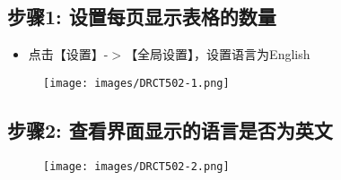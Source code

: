 \subsection{步骤1: 设置每页显示表格的数量}
\label{步骤1:设置每页显示表格的数量}

\begin{itemize}
\item 点击【设置】-$>$【全局设置】，设置语言为English

\end{itemize}

\begin{figure}[htbp]
\centering
\texttt{[image: images/DRCT502-1.png]}
\end{figure}

\subsection{步骤2: 查看界面显示的语言是否为英文}
\label{步骤2:查看界面显示的语言是否为英文}

\begin{figure}[htbp]
\centering
\texttt{[image: images/DRCT502-2.png]}
\end{figure}
